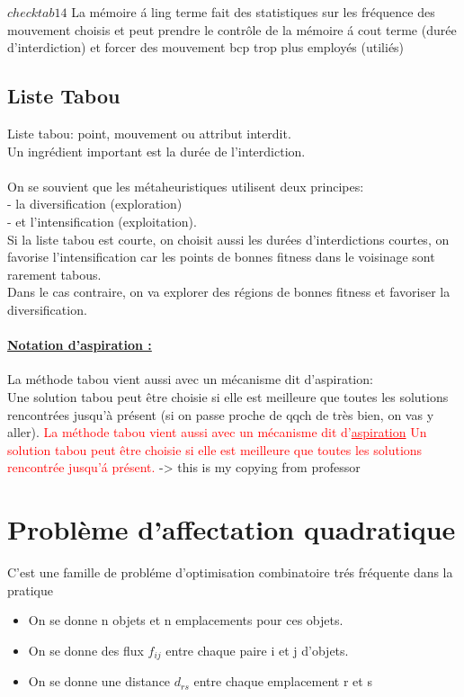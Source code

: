\begin{itemize}
$check tab 14$
La m\'emoire \'a ling terme fait des statistiques sur les fr\'equence des mouvement choisis et peut prendre le contr\^ole de la m\'emoire \'a cout terme (dur\'ee d'interdiction) et forcer  des mouvement bcp  trop plus employ\'es (utili\'es)

\end{itemize}

\subsection{Liste Tabou}
Liste tabou: point, mouvement ou attribut interdit.\\ Un ingrédient important est la durée de l'interdiction.\\ \\
On se souvient que les métaheuristiques utilisent deux principes:\\
- la diversification (exploration)\\
- et l'intensification (exploitation). \\

Si la liste tabou est courte, on choisit aussi les durées d'interdictions courtes, on favorise l'intensification car les points de bonnes fitness dans le voisinage sont rarement tabous. \\
Dans le cas contraire, on va explorer des régions de bonnes fitness et favoriser la diversification.\\

\paragraph{\underline{Notation d'aspiration :}} La méthode tabou vient aussi avec un mécanisme dit d'aspiration:\\
Une solution tabou peut être choisie si elle est meilleure que toutes les solutions rencontrées jusqu'à présent (si on passe proche de qqch de très bien, on vas y aller).
\textcolor{red}{La m\'ethode tabou vient aussi avec un m\'ecanisme dit d'\underline{aspiration}
Un solution tabou peut \^etre choisie si elle est meilleure que toutes les solutions rencontr\'ee jusqu'\'a pr\'esent.} -> this is my copying from professor 
\section{Probl\`eme d'affectation quadratique}
C'est une famille de probl\'eme d'optimisation combinatoire tr\'es fr\'equente dans la pratique \\
\begin{itemize}
\item On se donne n objets et n emplacements pour ces objets.
\item On se donne des flux $f_{ij}$ entre chaque paire i et j d'objets.
\item On se donne une distance $d_{rs}$ entre chaque emplacement r et s
\end{itemize}

